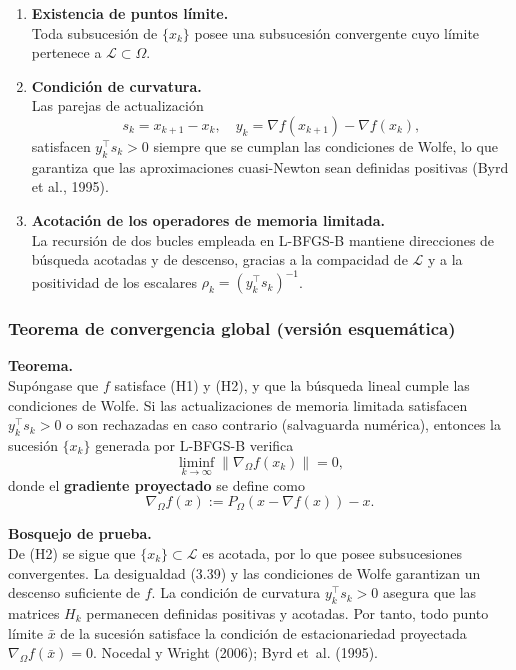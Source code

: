\documentclass[
  spanish,
  us-letterpaper,
  DIV=11,
  numbers=noendperiod]{scrreprt}
\numberwithin{equation}{section}
\begin{document}
\begin{enumerate}
\def\labelenumi{\arabic{enumi}.}
\item
  \textbf{Existencia de puntos límite.}\\
  Toda subsucesión de \(\{x_k\}\) posee una subsucesión convergente cuyo
  límite pertenece a \(\mathcal{L} \subset \Omega\).
\item
  \textbf{Condición de curvatura.}\\
  Las parejas de actualización\\
  \[
  s_k = x_{k+1} - x_k, \quad y_k = \nabla f(x_{k+1}) - \nabla f(x_k),
  \] satisfacen \(y_k^\top s_k > 0\) siempre que se cumplan las
  condiciones de Wolfe, lo que garantiza que las aproximaciones
  cuasi-Newton sean definidas positivas (Byrd et al., 1995).
\item
  \textbf{Acotación de los operadores de memoria limitada.}\\
  La recursión de dos bucles empleada en L-BFGS-B mantiene direcciones
  de búsqueda acotadas y de descenso, gracias a la compacidad de
  \(\mathcal{L}\) y a la positividad de los escalares
  \(\rho_k = (y_k^\top s_k)^{-1}\).
\end{enumerate}

\subsubsection{Teorema de convergencia global (versión
esquemática)}\label{teorema-de-convergencia-global-versiuxf3n-esquemuxe1tica}

\textbf{Teorema.}\\
Supóngase que \(f\) satisface (H1) y (H2), y que la búsqueda lineal
cumple las condiciones de Wolfe. Si las actualizaciones de memoria
limitada satisfacen \(y_k^\top s_k > 0\) o son rechazadas en caso
contrario (salvaguarda numérica), entonces la sucesión \(\{x_k\}\)
generada por L-BFGS-B verifica \[
\liminf_{k \to \infty} \|\nabla_\Omega f(x_k)\| = 0, \tag{3.40}
\] donde el \textbf{gradiente proyectado} se define como \[
\nabla_\Omega f(x) := P_\Omega(x - \nabla f(x)) - x. \tag{3.41}
\]

\textbf{Bosquejo de prueba.}\\
De (H2) se sigue que \(\{x_k\} \subset \mathcal{L}\) es acotada, por lo
que posee subsucesiones convergentes. La desigualdad (3.39) y las
condiciones de Wolfe garantizan un descenso suficiente de \(f\). La
condición de curvatura \(y_k^\top s_k > 0\) asegura que las matrices
\(H_k\) permanecen definidas positivas y acotadas. Por tanto, todo punto
límite \(\bar{x}\) de la sucesión satisface la condición de
estacionariedad proyectada \(\nabla_\Omega f(\bar{x}) = 0\). Nocedal y
Wright (2006); Byrd et~al. (1995).
\end{document}
